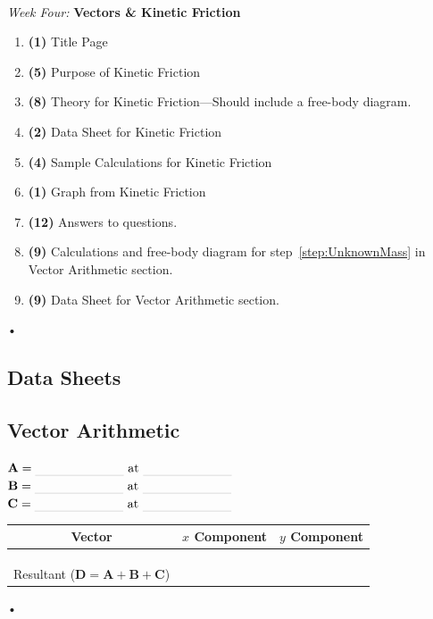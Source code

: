 \documentclass[main.tex]{subfiles}
\begin{document}
\begin{samepage}
\hrulefill \\
\emph{Week Four:} \textbf{Vectors \& Kinetic Friction}
\begin{enumerate}
\item
\textbf{(1)} Title Page
\item
\textbf{(5)} Purpose of Kinetic Friction
\item
\textbf{(8)} Theory for Kinetic Friction---Should include a free-body diagram.
\item
\textbf{(2)} Data Sheet for Kinetic Friction
\item
\textbf{(4)} Sample Calculations for Kinetic Friction
\item
\textbf{(1)} Graph from Kinetic Friction
\item
\textbf{(12)} Answers to questions.
\item
\textbf{(9)} Calculations and free-body diagram for step~\ref{step:UnknownMass} in Vector Arithmetic section.
\item
\textbf{(9)} Data Sheet for Vector Arithmetic section.
\end{enumerate}•

\newpage
\begin{doublespace}
\section{Data Sheets}
\subsection*{Vector Arithmetic}

\begin{centering}
$\mathbf{A}=\rule[-1mm]{2.5cm}{.1pt}\text{ at }\rule[-1mm]{2.5cm}{.1pt}$\\
$\mathbf{B}=\rule[-1mm]{2.5cm}{.1pt}\text{ at }\rule[-1mm]{2.5cm}{.1pt}$\\
$\mathbf{C}=\rule[-1mm]{2.5cm}{.1pt}\text{ at }\rule[-1mm]{2.5cm}{.1pt}$\\
\end{centering}\vspace{10pt}

\begin{tabular}{|c|c|c|}
\hline
Vector & $x$ Component & $y$ Component\\
\hline
&&\\
\hline
&&\\
\hline
&&\\
\hline
Resultant ($\mathbf{D}=\mathbf{A}+\mathbf{B}+\mathbf{C}$) &&\\
\hline
\end{tabular}•\\


\end{doublespace}
\end{samepage}
\end{document}
